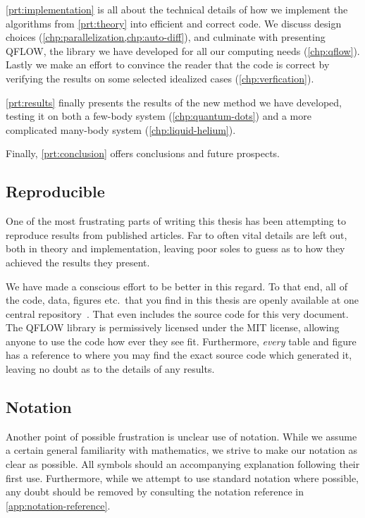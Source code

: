 \documentclass[Thesis.tex]{subfiles}
\begin{document}
\cref{prt:implementation} is all about the technical details of how we implement
the algorithms from \cref{prt:theory} into efficient and correct code. We
discuss design choices (\cref{chp:parallelization,chp:auto-diff}), and culminate
with presenting QFLOW, the library we have
developed for all our computing needs (\cref{chp:qflow}). Lastly we make an effort to convince the
reader that the code is correct by verifying the results on some
selected idealized cases (\cref{chp:verfication}).

\cref{prt:results} finally presents the results of the new method we have
developed, testing it on both a few-body system (\cref{chp:quantum-dots}) and a
more complicated many-body system (\cref{chp:liquid-helium}).

Finally, \cref{prt:conclusion} offers conclusions and future prospects.

\subsection{Reproducible}

One of the most frustrating parts of writing this thesis has been attempting to
reproduce results from published articles. Far to often vital details are left
out, both in theory and implementation, leaving poor soles to guess as to how
they achieved the results they present.

We have made a conscious effort to be
better in this regard. To that end, all of the code, data, figures etc.\ that
you find in this thesis are openly available at one central
repository~\cite{qflow}. That even includes the source code for this very
document. The QFLOW library is permissively licensed under the MIT license,
allowing anyone to use the code how ever they see fit. Furthermore, \emph{every} table
and figure has a reference to where you may find the exact source code which
generated it, leaving no doubt as to the details of any results.

\subsection{Notation}

Another point of possible frustration is unclear use of notation. While we
assume a certain general familiarity with mathematics, we strive to make our
notation as clear as possible. All symbols should an accompanying
explanation following their first use. Furthermore, while we attempt to use
standard notation where possible, any doubt should be removed by consulting the
notation reference in \cref{app:notation-reference}.
\end{document}
